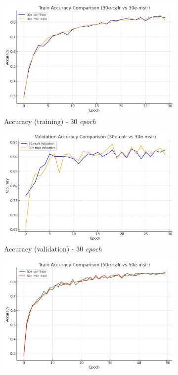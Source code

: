 \begin{figure}[htbp]
  \centering
  \begin{subfigure}{0.45\textwidth}
    \includegraphics[width=\textwidth]{gambar/bab4-train-acc-30e.png}
    \caption{Accuracy (training) - 30 \emph{epoch}}
  \end{subfigure}
  \hfill
  \begin{subfigure}{0.45\textwidth}
    \includegraphics[width=\textwidth]{gambar/bab4-val-acc-30e.png}
    \caption{Accuracy (validation) - 30 \emph{epoch}}
  \end{subfigure}
  \begin{subfigure}{0.45\textwidth}
    \includegraphics[width=\textwidth]{gambar/bab4-train-acc-50e.png}

\end{subfigure}
\end{figure}
